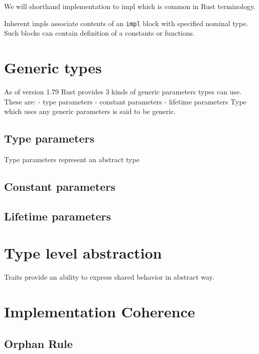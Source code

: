 We will shorthand implementation to impl which is common in Rust terminology.

Inherent impls associate contents of an \texttt{impl} block with specified nominal type.
Such blocks can contain definition of a constants or functions. 

\section{Generic types}

As of version 1.79 Rust provides 3 kinds of generic parameters types can use. 
These are:
- type parameters
- constant parameters
- lifetime parameters
Type which uses any generic parameters is said to be generic.

\subsection{Type parameters}

Type parameters represent an abstract type 

\subsection{Constant parameters}


\subsection{Lifetime parameters}


\section{Type level abstraction}

Traits provide an ability to express shared behavior in abstract way.

\section{Implementation Coherence}

\subsection{Orphan Rule}